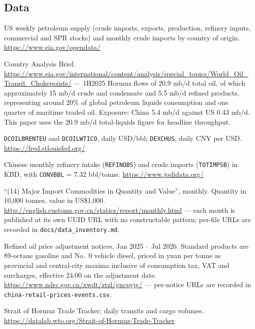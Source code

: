\documentclass[11pt]{article}
\begin{document}
\subsection*{Data}
\begin{description}[leftmargin=0.9em,style=nextline,itemsep=0.2em,parsep=0pt,topsep=0.2em]
\item[EIA API v2] US weekly petroleum supply (crude imports, exports, production,
refinery inputs, commercial and SPR stocks) and monthly crude imports by country of
origin. \url{https://www.eia.gov/opendata/}
\item[EIA, World Oil Transit Chokepoints] Country Analysis Brief.
\url{https://www.eia.gov/international/content/analysis/special_topics/World_Oil_Transit_Chokepoints/}
--- 1H2025 Hormuz flows of 20.9 mb/d total oil, of which approximately 15 mb/d crude
and condensate and 5.5 mb/d refined products, representing around 20\% of global
petroleum liquids consumption and one quarter of maritime traded oil. Exposure:
China 5.4 mb/d against US 0.43 mb/d. This paper uses the 20.9 mb/d total-liquids
figure for headline throughput.
\item[FRED, St.\ Louis Fed] \texttt{DCOILBRENTEU} and \texttt{DCOILWTICO}, daily
USD/bbl; \texttt{DEXCHUS}, daily CNY per USD. \url{https://fred.stlouisfed.org/}
\item[JODI Oil World Database] Chinese monthly refinery intake
(\texttt{REFINOBS}) and crude imports (\texttt{TOTIMPSB}) in KBD, with
\texttt{CONVBBL} = 7.32 bbl/tonne. \url{https://www.jodidata.org/}
\item[GACC] ``(14) Major Import Commodities in Quantity and Value'', monthly.
Quantity in 10,000 tonnes, value in US\$1,000.
\url{http://english.customs.gov.cn/statics/report/monthly.html} --- each month is
published at its own UUID URL with no constructable pattern; per-file URLs are
recorded in \texttt{docs/data\_inventory.md}.
\item[NDRC Price Department] Refined oil price adjustment notices, Jan 2025 --
Jul 2026. Standard products are 89-octane gasoline and No.~0 vehicle diesel, priced
in yuan per tonne as provincial and central-city maxima inclusive of consumption
tax, VAT and surcharges, effective 24:00 on the adjustment date.
\url{https://www.ndrc.gov.cn/xwdt/ztzl/gncpyjg/} --- per-notice URLs are recorded in
\texttt{china-retail-prices-events.csv}.
\item[WTO DataLab] Strait of Hormuz Trade Tracker; daily transits and cargo volumes.
\url{https://datalab.wto.org/Strait-of-Hormuz-Trade-Tracker}
\end{description}
\end{document}
